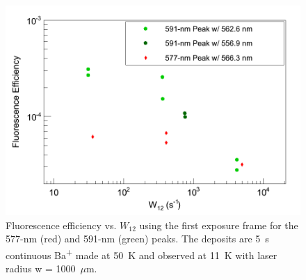 \begin{figure} %
        \centering
                \includegraphics[width=.7\textwidth]{figures/QE_just1000_separateSigmas.png}
                \caption{Fluorescence efficiency vs. $W_{12}$ using the first exposure frame for the 577-nm (red) and 591-nm (green) peaks.  The deposits are 5~s continuous Ba\textsuperscript{+} made at 50~K and observed at 11~K with laser radius w = 1000~$\mu$m.}
\label{fig:qe}
\end{figure}





